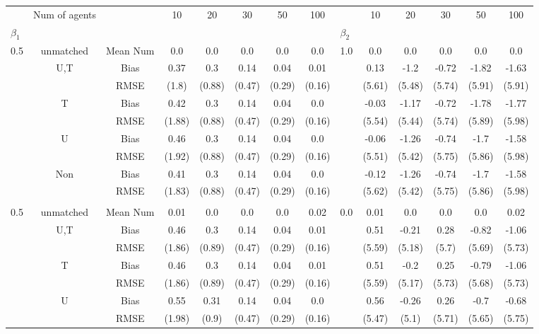 \begin{tabular}{@{\extracolsep{5pt}}lc|cccccc|lccccc}
\toprule 
 & Num of agents &  & 10 & 20 & 30 & 50 & 100 &  & 10 & 20 & 30 & 50 & 100 \\
$\beta_1$ &  &  &  &  &  &  &  & $\beta_2$ &  &  &  &  &  \\
\midrule 
0.5 & unmatched & Mean Num & 0.0 & 0.0 & 0.0 & 0.0 & 0.0 & 1.0 & 0.0 & 0.0 & 0.0 & 0.0 & 0.0 \\
 & U,T & Bias & 0.37 & 0.3 & 0.14 & 0.04 & 0.01 &  & 0.13 & -1.2 & -0.72 & -1.82 & -1.63 \\
 &  & RMSE & (1.8) & (0.88) & (0.47) & (0.29) & (0.16) &  & (5.61) & (5.48) & (5.74) & (5.91) & (5.91) \\
 & T & Bias & 0.42 & 0.3 & 0.14 & 0.04 & 0.0 &  & -0.03 & -1.17 & -0.72 & -1.78 & -1.77 \\
 &  & RMSE & (1.88) & (0.88) & (0.47) & (0.29) & (0.16) &  & (5.54) & (5.44) & (5.74) & (5.89) & (5.98) \\
 & U & Bias & 0.46 & 0.3 & 0.14 & 0.04 & 0.0 &  & -0.06 & -1.26 & -0.74 & -1.7 & -1.58 \\
 &  & RMSE & (1.92) & (0.88) & (0.47) & (0.29) & (0.16) &  & (5.51) & (5.42) & (5.75) & (5.86) & (5.98) \\
 & Non & Bias & 0.41 & 0.3 & 0.14 & 0.04 & 0.0 &  & -0.12 & -1.26 & -0.74 & -1.7 & -1.58 \\
 &  & RMSE & (1.83) & (0.88) & (0.47) & (0.29) & (0.16) &  & (5.62) & (5.42) & (5.75) & (5.86) & (5.98) \\
 &  &  &  &  &  &  &  &  &  &  &  &  &  \\
0.5 & unmatched & Mean Num & 0.01 & 0.0 & 0.0 & 0.0 & 0.02 & 0.0 & 0.01 & 0.0 & 0.0 & 0.0 & 0.02 \\
 & U,T & Bias & 0.46 & 0.3 & 0.14 & 0.04 & 0.01 &  & 0.51 & -0.21 & 0.28 & -0.82 & -1.06 \\
 &  & RMSE & (1.86) & (0.89) & (0.47) & (0.29) & (0.16) &  & (5.59) & (5.18) & (5.7) & (5.69) & (5.73) \\
 & T & Bias & 0.46 & 0.3 & 0.14 & 0.04 & 0.01 &  & 0.51 & -0.2 & 0.25 & -0.79 & -1.06 \\
 &  & RMSE & (1.86) & (0.89) & (0.47) & (0.29) & (0.16) &  & (5.59) & (5.17) & (5.73) & (5.68) & (5.73) \\
 & U & Bias & 0.55 & 0.31 & 0.14 & 0.04 & 0.0 &  & 0.56 & -0.26 & 0.26 & -0.7 & -0.68 \\
 &  & RMSE & (1.98) & (0.9) & (0.47) & (0.29) & (0.16) &  & (5.47) & (5.1) & (5.71) & (5.65) & (5.75) \\

\end{tabular}
